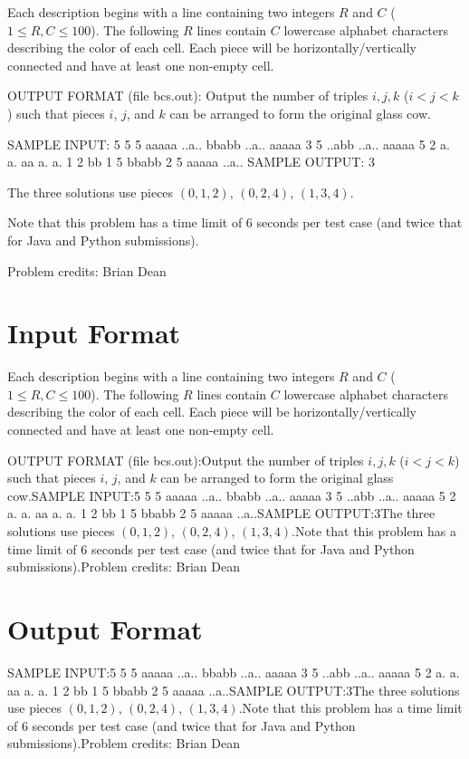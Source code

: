 \documentclass[12pt]{article}
\begin{document}
Each description begins with a line containing two integers $R$ and $C$
($1 \le R, C \le 100$).  The following $R$ lines contain $C$ lowercase alphabet
characters describing the color of each cell.  Each piece will be
horizontally/vertically connected and have at least one non-empty cell.

OUTPUT FORMAT (file bcs.out):
Output the number of triples $i, j, k$ ($i < j < k$) such that pieces $i$, $j$,
and $k$ can be arranged to form the original glass cow.

SAMPLE INPUT:
5
5 5
aaaaa
..a..
bbabb
..a..
aaaaa
3 5
..abb
..a..
aaaaa
5 2
a.
a.
aa
a.
a.
1 2
bb
1 5
bbabb
2 5
aaaaa
..a..
SAMPLE OUTPUT: 
3

The three solutions use pieces $(0, 1, 2)$, $(0, 2, 4)$, $(1, 3, 4)$.

Note that this problem has a time limit of 6 seconds per test case (and twice that for Java and Python submissions).


Problem credits: Brian Dean



\section*{Input Format}
Each description begins with a line containing two integers $R$ and $C$
($1 \le R, C \le 100$).  The following $R$ lines contain $C$ lowercase alphabet
characters describing the color of each cell.  Each piece will be
horizontally/vertically connected and have at least one non-empty cell.

OUTPUT FORMAT (file bcs.out):Output the number of triples $i, j, k$ ($i < j < k$) such that pieces $i$, $j$,
and $k$ can be arranged to form the original glass cow.SAMPLE INPUT:5
5 5
aaaaa
..a..
bbabb
..a..
aaaaa
3 5
..abb
..a..
aaaaa
5 2
a.
a.
aa
a.
a.
1 2
bb
1 5
bbabb
2 5
aaaaa
..a..SAMPLE OUTPUT:3The three solutions use pieces $(0, 1, 2)$, $(0, 2, 4)$, $(1, 3, 4)$.Note that this problem has a time limit of 6 seconds per test case (and twice that for Java and Python submissions).Problem credits: Brian Dean

\section*{Output Format}
SAMPLE INPUT:5
5 5
aaaaa
..a..
bbabb
..a..
aaaaa
3 5
..abb
..a..
aaaaa
5 2
a.
a.
aa
a.
a.
1 2
bb
1 5
bbabb
2 5
aaaaa
..a..SAMPLE OUTPUT:3The three solutions use pieces $(0, 1, 2)$, $(0, 2, 4)$, $(1, 3, 4)$.Note that this problem has a time limit of 6 seconds per test case (and twice that for Java and Python submissions).Problem credits: Brian Dean
\end{document}
